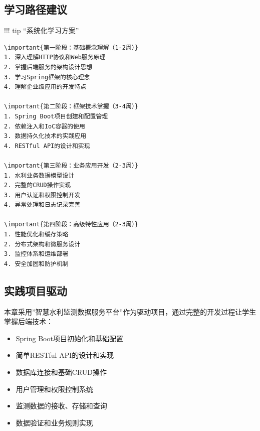 \hypertarget{ux5b66ux4e60ux8defux5f84ux5efaux8bae}{%
\subsection{学习路径建议}\label{ux5b66ux4e60ux8defux5f84ux5efaux8bae}}

!!! tip ``系统化学习方案''

\begin{verbatim}
\important{第一阶段：基础概念理解（1-2周）}
1. 深入理解HTTP协议和Web服务原理
2. 掌握后端服务的架构设计思想
3. 学习Spring框架的核心理念
4. 理解企业级应用的开发特点

\important{第二阶段：框架技术掌握（3-4周）}
1. Spring Boot项目创建和配置管理
2. 依赖注入和IoC容器的使用
3. 数据持久化技术的实践应用
4. RESTful API的设计和实现

\important{第三阶段：业务应用开发（2-3周）}
1. 水利业务数据模型设计
2. 完整的CRUD操作实现
3. 用户认证和权限控制开发
4. 异常处理和日志记录完善

\important{第四阶段：高级特性应用（2-3周）}
1. 性能优化和缓存策略
2. 分布式架构和微服务设计
3. 监控体系和运维部署
4. 安全加固和防护机制
\end{verbatim}

\hypertarget{ux5b9eux8df5ux9879ux76eeux9a71ux52a8}{%
\subsection{实践项目驱动}\label{ux5b9eux8df5ux9879ux76eeux9a71ux52a8}}

本章采用''智慧水利监测数据服务平台''作为驱动项目，通过完整的开发过程让学生掌握后端技术：


\begin{itemize}
\tightlist
\item
  Spring Boot项目初始化和基础配置
\item
  简单RESTful API的设计和实现
\item
  数据库连接和基础CRUD操作
\end{itemize}


\begin{itemize}
\tightlist
\item
  用户管理和权限控制系统
\item
  监测数据的接收、存储和查询
\item
  数据验证和业务规则实现
\end{itemize}

